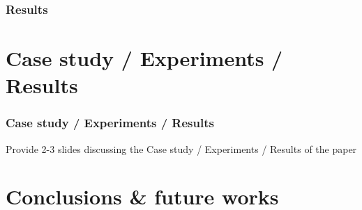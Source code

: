 \documentclass[handout]{beamer}\mode<handout>{\usetheme{AMSBolognaFC}}
\begin{document}
\begin{frame}[allowframebreaks]
    \frametitle{Results}



\end{frame}

\section{Case study / Experiments / Results}

\begin{frame}%
\frametitle{Case study / Experiments / Results}

    Provide 2-3 slides discussing the Case study / Experiments / Results of the paper

\end{frame}

\section{Conclusions \& future works}
\end{document}
